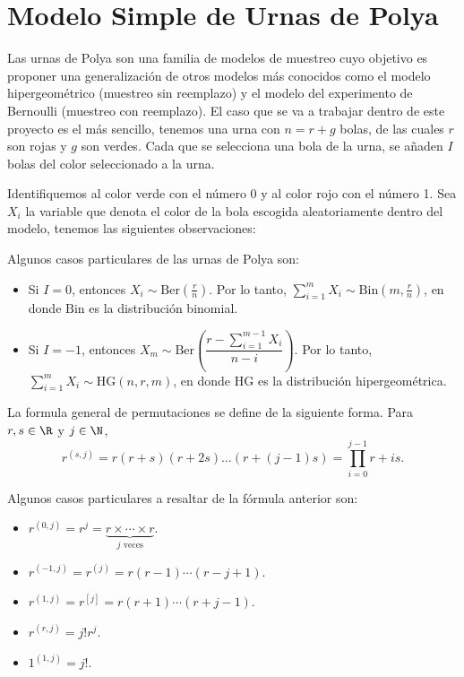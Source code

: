 \section{Modelo Simple de Urnas de Polya}

Las urnas de Polya son una familia de modelos de muestreo cuyo objetivo es proponer una generalización de otros modelos más conocidos como el modelo hipergeométrico (muestreo sin reemplazo) y el modelo del experimento de Bernoulli (muestreo con reemplazo). El caso que se va a trabajar dentro de este proyecto es el más sencillo, tenemos una urna con $n = r+g$ bolas, de las cuales $r$ son rojas y $g$ son verdes. Cada que se selecciona una bola de la urna, se añaden $I$ bolas del color seleccionado a la urna.

Identifiquemos al color verde con el número 0 y al color rojo con el número 1. Sea $X_i$ la variable que denota el color de la bola escogida aleatoriamente dentro del modelo, tenemos las siguientes observaciones:

\begin{remark} Algunos casos particulares de las urnas de Polya son:
    \begin{itemize}
        \item Si $I = 0$, entonces $X_i \sim \text{Ber}\left( \frac{r}{n} \right)$. Por lo tanto, $\sum_{i = 1}^{m} X_i \sim \text{Bin}(m,\frac{r}{n})$, en donde $\text{Bin}$ es la distribución binomial.
        \item Si $I = -1$, entonces $X_m \sim \text{Ber}\left( \dfrac{r-\sum_{i = 1}^{m-1} X_i}{n-i} \right)$. Por lo tanto, $\sum_{i = 1}^{m} X_i \sim \text{HG}(n,r,m)$, en donde $\text{HG}$ es la distribución hipergeométrica.
    \end{itemize}
\end{remark}

\begin{definition} 
    La formula general de permutaciones se define de la siguiente forma. Para $r,s\in\R$ y $j\in \N$,
    \[ r^{(s,j)} = r(r+s)(r+2s)\ldots(r+(j-1)s) = \prod_{i = 0}^{j-1} r+is. \]
\end{definition}

\begin{remark} Algunos casos particulares a resaltar de la fórmula anterior son:
    \begin{itemize}
        \item $r^{(0,j)} = r^j = \underbrace{r\times\cdots\times r}_{j\text{ veces}}$.
        \item $r^{(-1,j)} = r^{(j)} = r(r-1)\cdots (r-j+1)$.
        \item $r^{(1,j)} = r^{[j]} = r(r+1)\cdots(r+j-1)$.
        \item $r^{(r,j)} = j! r^j$.
        \item $1^{(1,j)} = j!$.
    \end{itemize}
\end{remark}
